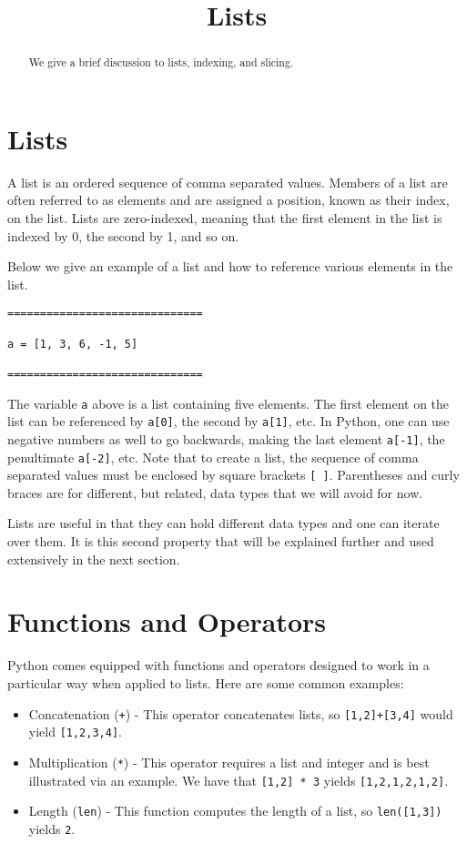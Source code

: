 \documentclass{ximera}
\title{Lists}
\begin{document}
  
\begin{abstract}  
We give a brief discussion to lists, indexing, and slicing.
\end{abstract}  
\maketitle

\section{Lists}

A list is an ordered sequence of comma separated values. Members of a list are often referred to as elements and are assigned a position, known as their index, on the list. Lists are zero-indexed, meaning that the first element in the list is indexed by 0, the second by 1, and so on.

Below we give an example of a list and how to reference various elements in the list.

\begin{verbatim}
==============================

a = [1, 3, 6, -1, 5]

==============================
\end{verbatim}

The variable \verb|a| above is a list containing five elements. The first element on the list can be referenced by \verb|a[0]|, the second by \verb|a[1]|, etc. In Python, one can use negative numbers as well to go backwards, making the last element \verb|a[-1]|, the penultimate \verb|a[-2]|, etc. Note that to create a list, the sequence of comma separated values must be enclosed by square brackets \verb|[ ]|. Parentheses and curly braces are for different, but related, data types that we will avoid for now.

Lists are useful in that they can hold different data types and one can iterate over them. It is this second property that will be explained further and used extensively in the next section. 

\section{Functions and Operators}

Python comes equipped with functions and operators designed to work in a particular way when applied to lists. Here are some common examples:

\begin{itemize}
	\item Concatenation (\verb|+|) - This operator concatenates lists, so \verb|[1,2]+[3,4]| would yield \verb|[1,2,3,4]|.
	\item Multiplication (\verb|*|) - This operator requires a list and integer and is best illustrated via an example. We have that \verb|[1,2] * 3| yields \verb|[1,2,1,2,1,2]|.
	\item Length (\verb|len|) - This function computes the length of a list, so \verb|len([1,3])| yields \verb|2|.
\end{itemize}
\end{document}
